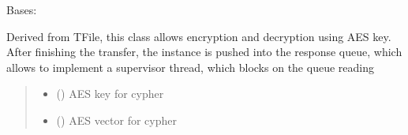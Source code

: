 \documentclass[letterpaper,10pt,english]{sphinxmanual}
\begin{document}
\begin{savenotes}\begin{fulllineitems}
\label{\detokenize{eezz:eezz.filesrv.TEezzFile}}
\pysigstartsignatures
{}
\pysigstopsignatures
\sphinxAtStartPar
Bases: {\hyperref[\detokenize{eezz:eezz.filesrv.TFile}]{}}

\sphinxAtStartPar
Derived from TFile, this class allows encryption and decryption using AES key.
After finishing the transfer, the instance is pushed into the response queue, which allows to implement a
supervisor thread, which blocks on the queue reading
\begin{quote}\begin{description}
\begin{itemize}
\item {} 
\sphinxAtStartPar
{} (\sphinxstyleliteralemphasis{\sphinxupquote{(}}\sphinxstyleliteralemphasis{\sphinxupquote{)}}) \textendash{} AES key for cypher

\item {} 
\sphinxAtStartPar
{} (\sphinxstyleliteralemphasis{\sphinxupquote{(}}\sphinxstyleliteralemphasis{\sphinxupquote{)}}) \textendash{} AES vector for cypher


\end{itemize}
\end{description}
\end{quote}
\end{fulllineitems}
\end{savenotes}
\end{document}

